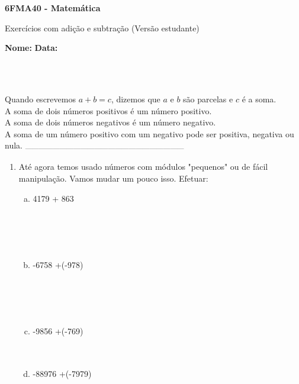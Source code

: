 \documentclass[a4paper,14pt]{article}
\begin{document}
	
	\noindent\textbf{6FMA40 - Matemática} 
	
	\begin{center}Exercícios com adição e subtração (Versão estudante)
	\end{center}
	
	\noindent\textbf{Nome:} \underline{\hspace{10cm}}
	\noindent\textbf{Data:} \underline{\hspace{4cm}}
	
	~ \\ ~
	\begin{multicols}{2}
		\noindent Quando escrevemos $a + b = c$, dizemos que $a$ e $b$ são parcelas e $c$ é a soma. \\
		A soma de dois números positivos é um número positivo. \\
		A soma de dois números negativos é um número negativo. \\
		A soma de um número positivo com um negativo pode ser positiva, negativa ou nula.
	\textsubscript{---------------------------------------------------------------------}
    	\begin{enumerate}
    		\item Até agora temos usado números com módulos "pequenos" ou de fácil manipulação. Vamos mudar um pouco isso. Efetuar:
    		\begin{enumerate}[a)]
    			\item 4179 + 863 \\\\\\\\\\
    			\item -6758 +(-978) \\\\\\\\\\
    			\item -9856 +(-769) \\\\\\
    			\item -88976 +(-7979) \\\\\\\\\\

\end{enumerate}
\end{enumerate}
\end{multicols}
\end{document}
